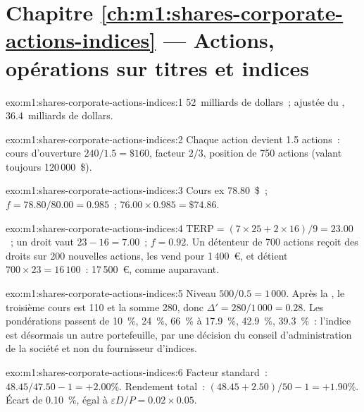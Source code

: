 \section*{Chapitre \ref{ch:m1:shares-corporate-actions-indices} --- Actions, opérations sur titres et indices}

\begin{solution}{exo:m1:shares-corporate-actions-indices:1}
52~milliards de dollars~; ajustée du , 36.4~milliards de dollars.
\end{solution}

\begin{solution}{exo:m1:shares-corporate-actions-indices:2}
Chaque action devient 1.5 actions~: cours d'ouverture $240/1.5 = \$160$, facteur
$2/3$, position de 750 actions (valant toujours 120\,000~\$).
\end{solution}

\begin{solution}{exo:m1:shares-corporate-actions-indices:3}
Cours ex 78.80~\$~; $f = 78.80/80.00 = 0.985$~; $76.00 \times 0.985 = \$74.86$.
\end{solution}

\begin{solution}{exo:m1:shares-corporate-actions-indices:4}
$\mathrm{TERP} = (7\times25 + 2\times16)/9 = 23.00$~; un droit vaut
$23 - 16 = 7.00$~; $f = 0.92$. Un détenteur de 700 actions reçoit des droits sur 200
nouvelles actions, les vend pour 1\,400~\euro, et détient $700 \times 23 = 16\,100$~:
17\,500~\euro, comme auparavant.
\end{solution}

\begin{solution}{exo:m1:shares-corporate-actions-indices:5}
Niveau $500/0.5 = 1\,000$. Après la , le troisième cours est 110 et la somme
280, donc $\Delta' = 280/1\,000 = 0.28$. Les pondérations passent de 10~\%, 24~\%, 66~\% à
17.9~\%, 42.9~\%, 39.3~\%~: l'indice est désormais un autre portefeuille, par une décision
du conseil d'administration de la société et non du fournisseur d'indices.
\end{solution}

\begin{solution}{exo:m1:shares-corporate-actions-indices:6}
Facteur standard~: $48.45/47.50 - 1 = +2.00\%$. Rendement total~: $(48.45 +
2.50)/50 - 1 = +1.90\%$. Écart de 0.10~\%, égal à $\varepsilon D/P = 0.02
\times 0.05$.
\end{solution}

